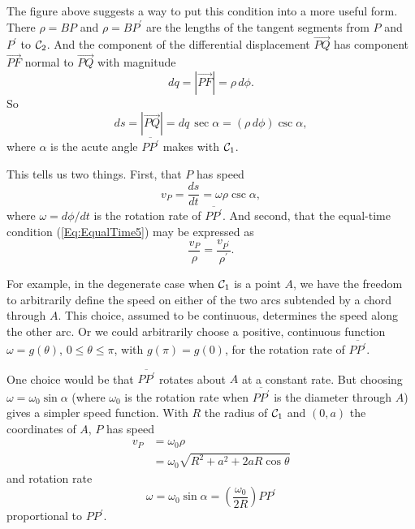 \documentclass{ximera}
\begin{document}
The figure above suggests a way to put this condition into a more useful form. There $\rho = BP$ and $\rho = BP^\prime$ are the lengths of the tangent segments from $P$ and $P^\prime$ to ${\cal C}_2$. And the component of the differential displacement $\overrightarrow{PQ}$ has component $\overrightarrow{PF}$ normal to $\overrightarrow{PQ}$ with magnitude
\[
   dq = |\overrightarrow{PF}| = \rho \, d\phi.
\]
So
\[
     ds = |\overrightarrow{PQ}| = dq \, \sec\alpha = (\rho \, d\phi) \csc\alpha ,
\]
where $\alpha$ is the acute angle $\overline{PP^\prime}$ makes with ${\cal C}_1$.

This tells us two things. First, that $P$ has speed
\[
   v_P = \frac{ds}{dt} = \omega \rho \csc\alpha ,
\]
where $\omega = d\phi/dt$ is the rotation rate of $\overline{PP^\prime}$. And second, that the equal-time condition (\ref{Eq:EqualTime5}) may be expressed as
\begin{equation}
    \frac{v_P}{\rho} = \frac{v_{P^\prime}}{\rho^\prime} .   \label{Eq:EqualTime23}
\end{equation}

For example, in the degenerate case when ${\cal C}_1$ is a point $A$, we have the freedom to arbitrarily define the speed on either of the two arcs subtended by a chord through $A$. This choice, assumed to be continuous, determines the speed along the other arc. Or we could arbitrarily choose a positive, continuous function $\omega  = g(\theta)$, $0\leq \theta \leq \pi$, with $g(\pi) = g(0)$, for the rotation rate of $\overline{PP^\prime}$.

One choice would be that $\overline{PP^\prime}$ rotates about $A$ at a constant rate. But choosing $\omega = \omega_0 \sin \alpha$ (where $\omega_0$ is the rotation rate when $\overline{PP^\prime}$ is the diameter through $A$) gives a simpler speed function. With $R$ the radius of ${\cal C}_1$ and $(0,a)$ the coordinates of $A$, $P$ has speed
\begin{align*}
   v_P &= \omega_0 \rho \\
          &= \omega_0  \sqrt{R^2 + a^2 + 2aR\cos\theta} 
\end{align*}
and rotation rate
\begin{equation}
   \omega = \omega_0 \sin\alpha = \left( \frac{\omega_0}{2R} \right) PP^\prime  \label{Eq:PendulumMotion}
\end{equation}
proportional to $PP^\prime$.

\begin{onlineOnly}
    \begin{center}
\end{center}
\end{onlineOnly}
\end{document}
